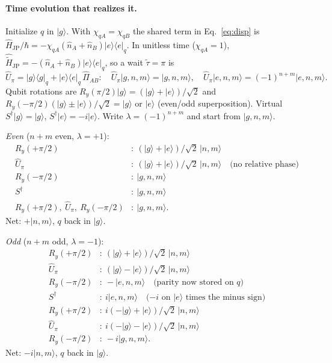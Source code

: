 \documentclass[11pt]{article}
\newcommand{\Pe}[1]{\lvert e\rangle\!\langle e\rvert_{#1}}
\newcommand{\Pab}{\hat{\Pi}_{AB}}
\begin{document}
\paragraph{Time evolution that realizes it.}
Initialize $q$ in $\lvert g\rangle$.  With $\chi_{qA}=\chi_{qB}$ the shared
term in Eq.~\eqref{eq:disp} is
$\hat{H}_{\mathrm{JP}}/\hbar=-\chi_{qA}(\hat{n}_A+\hat{n}_B)\Pe{q}$.
In unitless time ($\chi_{qA}=1$),
$\hat{\widetilde{H}}_{\mathrm{JP}}=-(\hat{n}_A+\hat{n}_B)\Pe{q}$, so a wait
$\tilde\tau=\pi$ is
\begin{equation}
\hat{U}_\pi
=\lvert g\rangle\!\langle g\rvert_q
 +\lvert e\rangle\!\langle e\rvert_q\,\Pab :
\quad
\hat{U}_\pi\lvert g,n,m\rangle=\lvert g,n,m\rangle,\quad
\hat{U}_\pi\lvert e,n,m\rangle=(-1)^{n+m}\lvert e,n,m\rangle.
\end{equation}
Qubit rotations are
$R_y(\pi/2)\lvert g\rangle=(\lvert g\rangle+\lvert e\rangle)/\sqrt{2}$
and
$R_y(-\pi/2)(\lvert g\rangle\pm\lvert e\rangle)/\sqrt{2}=\lvert g\rangle$
or $\lvert e\rangle$ (even/odd superposition).  Virtual
$S^\dagger\lvert g\rangle=\lvert g\rangle$,
$S^\dagger\lvert e\rangle=-i\lvert e\rangle$.
Write $\lambda=(-1)^{n+m}$ and start from $\lvert g,n,m\rangle$.

\textit{Even} ($n+m$ even, $\lambda=+1$):
\begin{align*}
R_y(+\pi/2)
  &\colon\ (\lvert g\rangle+\lvert e\rangle)/\sqrt{2}\,\lvert n,m\rangle\\
\hat{U}_\pi
  &\colon\ (\lvert g\rangle+\lvert e\rangle)/\sqrt{2}\,\lvert n,m\rangle
  \quad\text{(no relative phase)}\\
R_y(-\pi/2)
  &\colon\ \lvert g,n,m\rangle\\
S^\dagger
  &\colon\ \lvert g,n,m\rangle\\
R_y(+\pi/2),\ \hat{U}_\pi,\ R_y(-\pi/2)
  &\colon\ \lvert g,n,m\rangle.
\end{align*}
Net: $+\lvert n,m\rangle$, $q$ back in $\lvert g\rangle$.

\textit{Odd} ($n+m$ odd, $\lambda=-1$):
\begin{align*}
R_y(+\pi/2)
  &\colon\ (\lvert g\rangle+\lvert e\rangle)/\sqrt{2}\,\lvert n,m\rangle\\
\hat{U}_\pi
  &\colon\ (\lvert g\rangle-\lvert e\rangle)/\sqrt{2}\,\lvert n,m\rangle\\
R_y(-\pi/2)
  &\colon\ -\lvert e,n,m\rangle
  \quad\text{(parity now stored on $q$)}\\
S^\dagger
  &\colon\ i\lvert e,n,m\rangle
  \quad\text{($-i$ on $\lvert e\rangle$ times the minus sign)}\\
R_y(+\pi/2)
  &\colon\ i(-\lvert g\rangle+\lvert e\rangle)/\sqrt{2}\,\lvert n,m\rangle\\
\hat{U}_\pi
  &\colon\ i(-\lvert g\rangle-\lvert e\rangle)/\sqrt{2}\,\lvert n,m\rangle\\
R_y(-\pi/2)
  &\colon\ -i\lvert g,n,m\rangle.
\end{align*}
Net: $-i\lvert n,m\rangle$, $q$ back in $\lvert g\rangle$.
\end{document}
